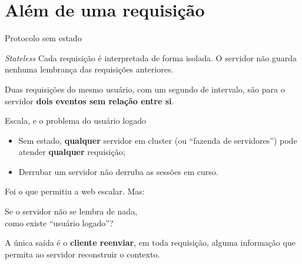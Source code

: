 \documentclass{beamer}
\begin{document}
\section{Além de uma requisição}

\begin{frame}{Protocolo sem estado}
  \begin{block}{\textit{Stateless}}
    Cada requisição é interpretada de forma isolada. O servidor não guarda
    nenhuma lembrança das requisições anteriores.
  \end{block}

  \vspace{0.4cm}
  Duas requisições do mesmo usuário, com um segundo de intervalo, são para o
  servidor \textbf{dois eventos sem relação entre si}.
\end{frame}

\begin{frame}{Escala, e o problema do usuário logado}
  \begin{itemize}
    \item Sem estado, \textbf{qualquer} servidor em cluster (ou ``fazenda de
          servidores'') pode atender \textbf{qualquer} requisição;
    \item Derrubar um servidor não derruba as sessões em curso.
  \end{itemize}

  Foi o que permitiu a web escalar. Mas:

  \vspace{0.4cm}
  \begin{center}
    \Large Se o servidor não se lembra de nada, \\ como existe ``usuário logado''?
  \end{center}

  \vspace{0.4cm}
  A única saída é o \textbf{cliente reenviar}, em toda requisição, alguma
  informação que permita ao servidor reconstruir o contexto.
\end{frame}
\end{document}
